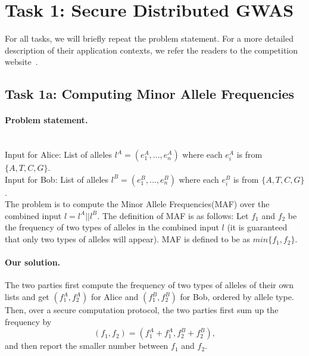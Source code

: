 \section{Task 1: Secure Distributed GWAS}
For all tasks, we will briefly 
repeat the problem statement.
For a more detailed description of their application
contexts, we refer the readers to the
competition website~\cite{idash}.

\subsection*{Task 1a: Computing Minor Allele Frequencies}
\paragraph{Problem statement.}
~\\
Input for Alice: List of alleles $l^A = (e^A_1,...,e^A_n)$ 
where each $e^A_i$ is from $\{A, T, C, G\}$.\\
Input for Bob: List of alleles $l^B = (e^B_1,...,e^B_n)$
where each $e^B_i$ is from $\{A, T, C, G\}$.\\

The problem is to compute the 
Minor Allele Frequencies(MAF) over 
the combined input $l = l^A || l^B$. 
The definition of MAF is as follows:
Let $f_1$ and $f_2$ be the frequency of two types of alleles in the
combined input $l$ (it is guaranteed
that only two types of alleles will appear). 
MAF is defined to be as $min\{f_1, f_2\}$.

\paragraph{Our solution.}
The two parties first compute the frequency of two types of alleles of their own lists and get
$(f^A_1, f^A_2)$ for Alice and $(f^B_1,f^B_2)$ for Bob, ordered by allele type.
Then, over a secure computation protocol, 
the two parties first sum up the frequency by
$$(f_1, f_2) = (f^A_1+f^A_1, f^B_2+f^B_2),$$
and then report the smaller number between $f_1$ and $f_2$.


